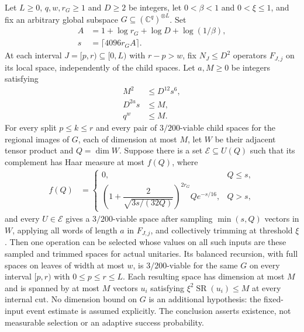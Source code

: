 \begin{lemma}
    \label{thm:sampled_interval_witness_tree}
    \leanok
    Let $L\ge0$, $q,w,r_G\ge1$ and $D\ge2$ be integers, let $0<\beta<1$
    and $0<\xi\le1$, and fix an arbitrary global subspace
    $G\subseteq(\mathbb C^q)^{\otimes L}$. Set
    \begin{align}
        A & =1+\log r_G+\log D+\log(1/\beta),\nonumber \\
        s & =\lceil4096r_GA\rceil.
        \label{eq:sampled_tree_sample_size}
    \end{align}
    At each interval $J=[p,r)\subseteq[0,L)$ with $r-p>w$, fix
    $N_J\le D^2$ operators $F_{J,j}$ on its local space, independently of
    the child spaces. Let $a,M\ge0$ be integers satisfying
    \begin{align}
        M^2     & \le D^{12}s^6,\nonumber \\
        D^{2a}s & \le M,\nonumber         \\
        q^w     & \le M.
        \label{eq:sampled_tree_count_hypotheses}
    \end{align}
    For every split $p\le k\le r$ and every pair of $3/200$-viable child
    spaces for the regional images of $G$, each of dimension at most $M$,
    let $W$ be their adjacent tensor product and $Q=\dim W$. Suppose there
    is a set $\mathcal E\subseteq U(Q)$ such that its complement has Haar
    measure at most $f(Q)$, where
    \begin{align}
        f(Q) & =\begin{cases}
                    0,          & Q\le s, \\
                    \left(1+\dfrac{2}{\sqrt{3s/(32Q)}}\right)^{2r_G}
                    Qe^{-s/16}, & Q>s,
                \end{cases}
        \label{eq:sampled_tree_failure}
    \end{align}
    and every $U\in\mathcal E$ gives a $3/200$-viable space after sampling
    $\min(s,Q)$ vectors in $W$, applying all words of length $a$ in
    $F_{J,j}$, and collectively trimming at threshold $\xi$.
    Then one operation can be selected whose values on all such inputs
    are these sampled and trimmed spaces for actual unitaries. Its balanced
    recursion, with full spaces on leaves of width at most $w$, is
    $3/200$-viable for the same $G$ on every interval $[p,r)$ with
    $0\le p\le r\le L$. Each resulting space has dimension at most $M$
    and is spanned by at most $M$ vectors $u_i$ satisfying
    $\xi^2\operatorname{SR}(u_i)\le M$ at every internal cut.
    No dimension bound on $G$ is an additional hypothesis: the fixed-input
    event estimate is assumed explicitly. The conclusion asserts existence,
    not measurable selection or an adaptive success probability.


\end{lemma}

